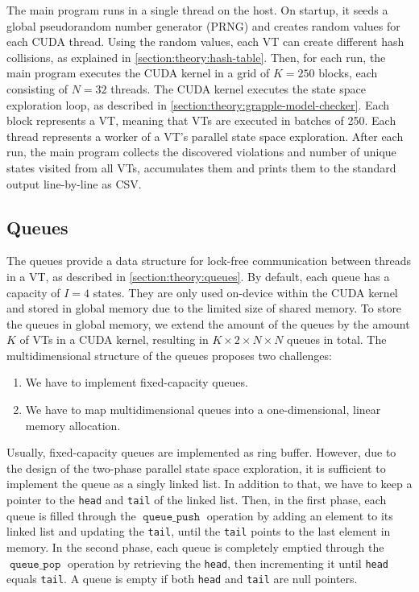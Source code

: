 \documentclass[
fancyheadings, %
%
%
]{stsreprt}
\DeclareMathOperator{\qPop}{\texttt{queue\_pop}}
\DeclareMathOperator{\qPush}{\texttt{queue\_push}}
\begin{document}
The main program runs in a single thread on the host.
On startup, it seeds a global pseudorandom number generator (PRNG) and creates random values for each CUDA thread.
Using the random values, each VT can create different hash collisions, as explained in \cref{section:theory:hash-table}.
Then, for each run, the main program executes the CUDA kernel in a grid of $K=250$ blocks, each consisting of $N=32$ threads.
The CUDA kernel executes the state space exploration loop, as described in \cref{section:theory:grapple-model-checker}.
Each block represents a VT, meaning that VTs are executed in batches of 250.
Each thread represents a worker of a VT's parallel state space exploration.
After each run, the main program collects the discovered violations and number of unique states visited from all VTs, accumulates them and prints them to the standard output line-by-line as CSV.

\subsection{Queues}
\label{section:implementation:queues}

The queues provide a data structure for lock-free communication between threads in a VT, as described in \cref{section:theory:queues}.
By default, each queue has a capacity of $I=4$ states.
They are only used on-device within the CUDA kernel and stored in global memory due to the limited size of shared memory.
To store the queues in global memory, we extend the amount of the queues by the amount $K$ of VTs in a CUDA kernel, resulting in $K \times 2 \times N \times N$ queues in total.
The multidimensional structure of the queues proposes two challenges:

\begin{enumerate}
    \item We have to implement fixed-capacity queues.
    \item We have to map multidimensional queues into a one-dimensional, linear memory allocation.
\end{enumerate}

Usually, fixed-capacity queues are implemented as ring buffer.
However, due to the design of the two-phase parallel state space exploration, it is sufficient to implement the queue as a singly linked list.
In addition to that, we have to keep a pointer to the \texttt{head} and \texttt{tail} of the linked list.
Then, in the first phase, each queue is filled through the $\qPush$ operation by adding an element to its linked list and updating the \texttt{tail}, until the \texttt{tail} points to the last element in memory.
In the second phase, each queue is completely emptied through the $\qPop$ operation by retrieving the \texttt{head}, then incrementing it until \texttt{head} equals \texttt{tail}.
A queue is empty if both \texttt{head} and \texttt{tail} are null pointers.
\end{document}
